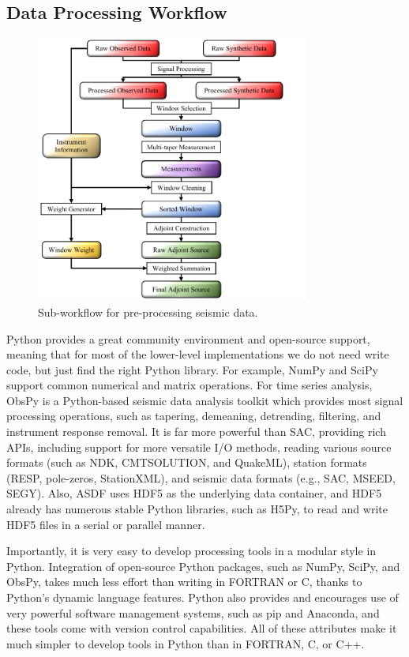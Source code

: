 \subsection{Data Processing Workflow}
\begin{figure}
  \centering
  \includegraphics[width=0.8\textwidth]{ch-GLADM25/figures/Preprocess_workflow.pdf}
  \caption[Sub-workflow for pre-processing seismic data]
  {\small{Sub-workflow for pre-processing seismic data.}}
  \label{fig:preprocess_workflow}
\end{figure}

Python provides a great community environment and open-source support,
meaning that for most
of the lower-level implementations we do not need write code, but
just find the right Python library.
For example,
NumPy and SciPy support common numerical and matrix operations.
For time series analysis,
ObsPy is a Python-based seismic data analysis toolkit which provides
most signal processing operations, such as tapering, demeaning, detrending, filtering, and instrument response removal.
It is far more powerful than SAC,
providing rich APIs, including support for more versatile I/O methods, reading
various source formats (such as NDK, CMTSOLUTION, and QuakeML),
station formats (RESP, pole-zeros, StationXML),
and seismic data formats (e.g., SAC, MSEED, SEGY).
Also, ASDF uses HDF5 as the underlying data container,
and HDF5 already has numerous stable Python libraries, such as H5Py,
to read and write HDF5 files in a serial or parallel manner.

Importantly, it is very easy to develop processing tools in a modular style in Python.
Integration of open-source Python packages,
such as NumPy, SciPy, and ObsPy, takes much
less effort than writing in FORTRAN or C, thanks to Python's dynamic language features.
Python also provides and encourages use of very powerful software management systems,
such as pip and Anaconda,
and these tools come with version control capabilities.
All of these attributes make it much simpler to develop tools in Python than in
FORTRAN, C, or C++.

